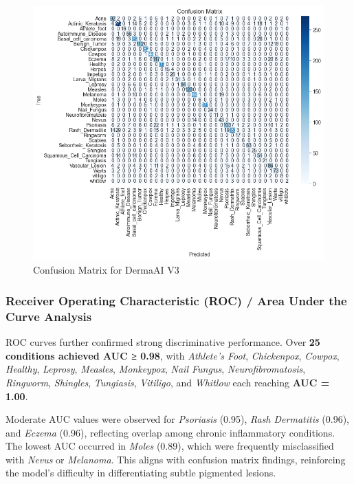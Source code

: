 \documentclass[
  12pt,
  oneside]{article}
\begin{document}
\begin{figure}

{\centering \includegraphics[width=1\linewidth]{confusion_matrix} 

}

\caption{Confusion Matrix for DermaAI V3}\label{fig:unnamed-chunk-19}
\end{figure}

\subsubsection{Receiver Operating Characteristic (ROC) / Area Under the
Curve
Analysis}\label{receiver-operating-characteristic-roc-area-under-the-curve-analysis}

ROC curves further confirmed strong discriminative performance. Over
\textbf{25 conditions achieved AUC ≥ 0.98}, with \emph{Athlete's Foot},
\emph{Chickenpox}, \emph{Cowpox}, \emph{Healthy}, \emph{Leprosy},
\emph{Measles}, \emph{Monkeypox}, \emph{Nail Fungus},
\emph{Neurofibromatosis}, \emph{Ringworm}, \emph{Shingles},
\emph{Tungiasis}, \emph{Vitiligo}, and \emph{Whitlow} each reaching
\textbf{AUC = 1.00}.

Moderate AUC values were observed for \emph{Psoriasis} (0.95),
\emph{Rash Dermatitis} (0.96), and \emph{Eczema} (0.96), reflecting
overlap among chronic inflammatory conditions. The lowest AUC occurred
in \emph{Moles} (0.89), which were frequently misclassified with
\emph{Nevus} or \emph{Melanoma}. This aligns with confusion matrix
findings, reinforcing the model's difficulty in differentiating subtle
pigmented lesions.
\end{document}
